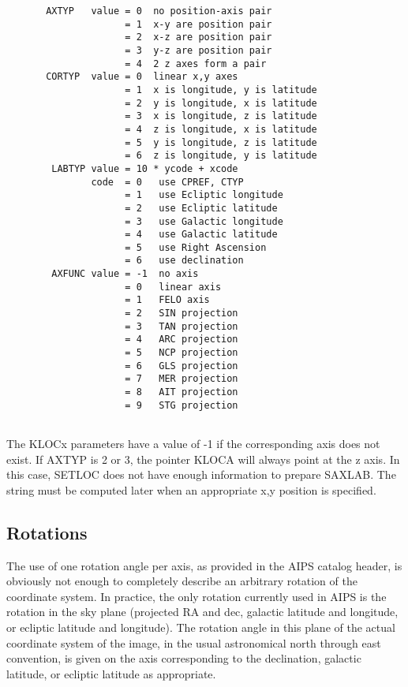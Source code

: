 \begin{verbatim}
       AXTYP   value = 0  no position-axis pair
                     = 1  x-y are position pair
                     = 2  x-z are position pair
                     = 3  y-z are position pair
                     = 4  2 z axes form a pair
       CORTYP  value = 0  linear x,y axes
                     = 1  x is longitude, y is latitude
                     = 2  y is longitude, x is latitude
                     = 3  x is longitude, z is latitude
                     = 4  z is longitude, x is latitude
                     = 5  y is longitude, z is latitude
                     = 6  z is longitude, y is latitude
        LABTYP value = 10 * ycode + xcode
               code  = 0   use CPREF, CTYP
                     = 1   use Ecliptic longitude
                     = 2   use Ecliptic latitude
                     = 3   use Galactic longitude
                     = 4   use Galactic latitude
                     = 5   use Right Ascension
                     = 6   use declination
        AXFUNC value = -1  no axis
                     = 0   linear axis
                     = 1   FELO axis
                     = 2   SIN projection
                     = 3   TAN projection
                     = 4   ARC projection
                     = 5   NCP projection
                     = 6   GLS projection
                     = 7   MER projection
                     = 8   AIT projection
                     = 9   STG projection


\end{verbatim}
The KLOCx parameters have a value of -1 if the corresponding axis does
not exist.  If AXTYP is 2 or 3, the pointer KLOCA will always point at
the z axis.  In this case, SETLOC does not have enough information to
prepare SAXLAB.  The string must be computed later when an
appropriate x,y position is specified.


\subsection{Rotations}
The use of one rotation angle per axis, as provided in the AIPS
catalog header, is obviously not enough to completely describe an
arbitrary rotation of the coordinate system. In practice, the only
rotation currently used in AIPS is the rotation in the sky plane
(projected RA and dec, galactic latitude and longitude, or ecliptic
latitude and longitude). The rotation angle in this plane of the
actual coordinate system of the image, in the usual astronomical north
through east convention, is given on the axis corresponding to the
declination, galactic latitude, or ecliptic latitude as appropriate.

